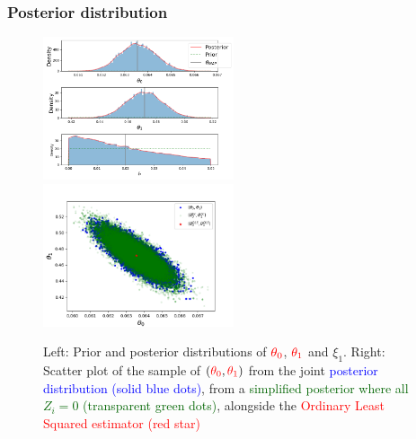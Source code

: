 \documentclass{beamer}
\begin{document}
\begin{frame}
    \frametitle{Posterior distribution}

    \begin{figure}[H]
        \centering
            \includegraphics[width=0.5\textwidth]{figures/vacuum_lock_reduced_final_joint_prior_posterior_plot.png}\hfill
            \includegraphics[width=0.5\textwidth]{figures/vacuum_lock_reduced_final_joint_scatterplot_theta.png}
            \caption{Left: Prior and posterior distributions of $\textcolor{red}{\theta_0}$, $\textcolor{red}{\theta_1}$ and $\xi_1$. Right: Scatter plot of the sample of $(\textcolor{red}{\theta_0}, \textcolor{red}{\theta_1})$ from the joint \textcolor{blue}{posterior distribution (solid blue dots)}, from a \textcolor{darkgreen}{simplified posterior where all $Z_i = 0$ (transparent green dots)}, alongside the \textcolor{red}{Ordinary Least Squared estimator (red star)}}
            \label{fig:vacuum_joint_prior_posterior}
    \end{figure}
\end{frame}

\end{document}

